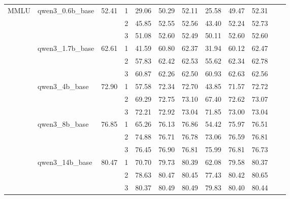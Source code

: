 \begin{table}[htbp]
{\begin{tabular}{llcccccccccc}
    \multirow{15}{*}{MMLU}
    & \multirow{3}{*}{qwen3\_0.6b\_base} & \multirow{3}{*}{52.41}
    & 1 & 29.06 & 50.29 & 52.11 & 25.58 & 49.47 & 52.31 \\
    & & & 2 & 45.85 & 52.55 & 52.56 & 43.40 & 52.24 & 52.73 \\
    & & & 3 & 51.08 & 52.60 & 52.49 & 50.11 & 52.60 & 52.60 \\
    \cmidrule(lr){2-10}
    & \multirow{3}{*}{qwen3\_1.7b\_base} & \multirow{3}{*}{62.61}
    & 1 & 41.59 & 60.80 & 62.37 & 31.94 & 60.12 & 62.47 \\
    & & & 2 & 57.83 & 62.42 & 62.53 & 55.62 & 62.34 & 62.78 \\
    & & & 3 & 60.87 & 62.26 & 62.50 & 60.93 & 62.63 & 62.56 \\
    \cmidrule(lr){2-10}
    & \multirow{3}{*}{qwen3\_4b\_base} & \multirow{3}{*}{72.90}
    & 1 & 57.58 & 72.34 & 72.70 & 43.85 & 71.57 & 72.72 \\
    & & & 2 & 69.29 & 72.75 & 73.10 & 67.40 & 72.62 & 73.07 \\
    & & & 3 & 72.21 & 72.92 & 73.04 & 71.85 & 73.00 & 73.04 \\
    \cmidrule(lr){2-10}
    & \multirow{3}{*}{qwen3\_8b\_base} & \multirow{3}{*}{76.85}
    & 1 & 65.26 & 76.13 & 76.86 & 54.42 & 75.97 & 76.51 \\
    & & & 2 & 74.88 & 76.71 & 76.78 & 73.06 & 76.59 & 76.81 \\
    & & & 3 & 76.45 & 76.90 & 76.81 & 75.99 & 76.81 & 76.73 \\
    \cmidrule(lr){2-10}
    & \multirow{3}{*}{qwen3\_14b\_base} & \multirow{3}{*}{80.47}
    & 1 & 70.70 & 79.73 & 80.39 & 62.08 & 79.58 & 80.37 \\
    & & & 2 & 78.63 & 80.47 & 80.45 & 77.43 & 80.42 & 80.65 \\
    & & & 3 & 80.37 & 80.49 & 80.49 & 79.83 & 80.40 & 80.44 \\

    \bottomrule
  \end{tabular}
  }
\end{table}



